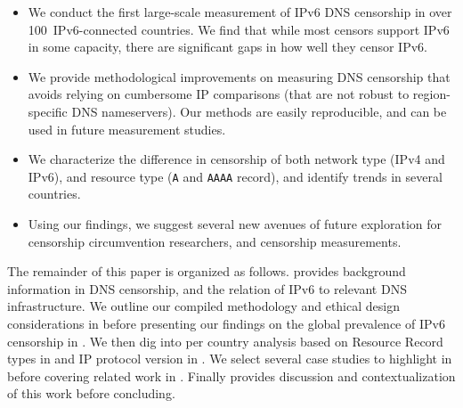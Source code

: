 \begin{itemize}
    \item
    We conduct the first large-scale measurement of IPv6 DNS censorship in over
    100~IPv6-connected countries. We find that while most censors support IPv6
    in some capacity, there are significant gaps in how well they censor IPv6.

    \item We provide methodological improvements on measuring DNS censorship
    that avoids relying on cumbersome IP comparisons (that are not
    robust to region-specific DNS nameservers). Our methods are easily
    reproducible, and can be used in future measurement studies.

    \item We characterize the difference in censorship of both network type
    (IPv4 and IPv6), and resource type ({\tt A} and {\tt AAAA} record), and
    identify trends in several countries.

    \item Using our findings, we suggest several new avenues of future
    exploration for censorship circumvention researchers, and censorship
    measurements.

\end{itemize}

The remainder of this paper is organized as follows.  provides
background information in DNS censorship, and the relation of IPv6 to relevant DNS
infrastructure. We outline our compiled methodology and ethical design
considerations in  before presenting our findings on the
global prevalence of IPv6 censorship in . We then dig into
per country analysis based on Resource Record types in  and
IP protocol version in . We select several case studies
to highlight in  before covering related work in
. Finally  provides discussion and
contextualization of this work before concluding.


